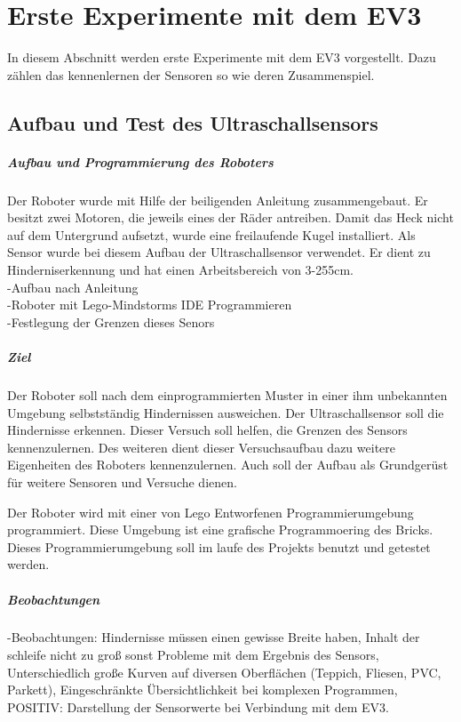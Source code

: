 \chapter{Erste Experimente mit dem EV3}
In diesem Abschnitt werden erste Experimente mit dem EV3 vorgestellt. Dazu zählen das kennenlernen der Sensoren so wie deren Zusammenspiel. 
\section{Aufbau und Test des Ultraschallsensors}
\paragraph{Aufbau und Programmierung des Roboters}
Der Roboter wurde mit Hilfe der beiligenden Anleitung zusammengebaut. Er besitzt zwei Motoren, die jeweils eines der Räder antreiben. Damit das Heck nicht auf dem Untergrund aufsetzt, wurde eine freilaufende Kugel installiert. 
Als Sensor wurde bei diesem Aufbau der Ultraschallsensor verwendet. Er dient zu Hinderniserkennung und hat einen Arbeitsbereich von 3-255cm. \\
 
-Aufbau nach Anleitung\\
-Roboter mit Lego-Mindstorms IDE Programmieren \\
-Festlegung der Grenzen dieses Senors\\
\paragraph{Ziel}
Der Roboter soll nach dem einprogrammierten Muster in einer ihm unbekannten Umgebung selbstständig Hindernissen ausweichen. Der Ultraschallsensor soll die Hindernisse erkennen. Dieser Versuch soll helfen, die Grenzen des Sensors kennenzulernen. Des weiteren dient dieser Versuchsaufbau dazu weitere Eigenheiten des Roboters kennenzulernen. Auch soll der Aufbau als Grundgerüst für weitere Sensoren und Versuche dienen.  

Der Roboter wird mit einer von Lego Entworfenen Programmierumgebung programmiert. Diese Umgebung ist eine grafische Programmoering des Bricks. Dieses Programmierumgebung soll im laufe des Projekts benutzt und getestet werden. 
\paragraph{Beobachtungen}
-Beobachtungen: Hindernisse müssen einen gewisse Breite haben, Inhalt der schleife nicht zu groß sonst Probleme mit dem Ergebnis des Sensors, Unterschiedlich große Kurven auf diversen Oberflächen (Teppich, Fliesen, PVC, Parkett), Eingeschränkte Übersichtlichkeit bei komplexen Programmen,
POSITIV: Darstellung der Sensorwerte bei Verbindung mit dem EV3. \\

